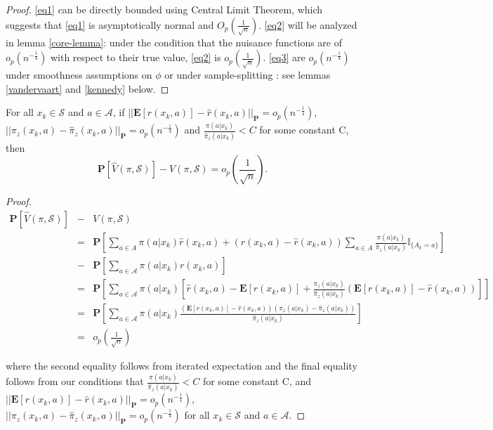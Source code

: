 \begin{proof}
\eqref{eq1} can be directly bounded using Central Limit Theorem, which suggests that \eqref{eq1} is asymptotically normal and  $O_p(\frac{1}{\sqrt{n}})$. \eqref{eq2} will be analyzed in lemma \ref{core-lemma}: under the condition that the nuisance functions are of $o_p(n^{-\frac{1}{4}})$ with respect to their true value, \eqref{eq2} is $o_p(\frac{1}{\sqrt{n}})$. \eqref{eq3} are $o_p(n^{-\frac{1}{4}})$ under smoothness assumptions on $\phi$ \cite{van2000asymptotic} or under sample-splitting \cite{kennedy2018sharp}: see lemmas \ref{vandervaart} and \ref{kennedy} below. 
\end{proof}



\begin{lemma} \label{core-lemma}
For all $x_k \in \mathcal{S}$ and $a \in \mathcal{A}$, if $||\mathbf{E}[r(x_k, a)] - \hat{r}(x_k, a)||_{\mathbf{P}} = o_p(n^{-\frac{1}{4}})$,
\\ $||\pi_z(x_k, a) - \hat{\pi}_z(x_k, a)||_{\mathbf{P}} = o_p(n^{-\frac{1}{4}})$ and $\frac{\pi(a|x_k)}{\hat{\pi}_z(a|x_k)} <  C$ for some constant C, then
$$\mathbf{P}[\widehat{V}(\pi, \mathcal{S})] - V(\pi, \mathcal{S}) = o_p(\frac{1}{\sqrt{n}}).$$
\end{lemma}

\begin{proof}
\begin{eqnarray*}
\mathbf{P}[\widehat{V}(\pi, \mathcal{S})]  &-& V(\pi, \mathcal{S})\\ 
 &=& \mathbf{P}\left[\sum_{a \in A} \pi(a|x_k) \hat{r}(x_k, a) +   (r(x_k, a) - \hat{r}(x_k, a))   \sum_{a \in A} \frac{\pi(a|x_k)}{\hat{\pi}_{z}(a|x_k)}  \mathbb{I}_{\{A_k =a\}} \right] \\
 &-& \mathbf{P} \left[ \sum_{a \in \mathcal{A}} \pi(a|x_k) r(x_k, a)  \right] \\
 &=& \mathbf{P} \left[  \sum_{a \in \mathcal{A}} \pi(a|x_k) \left[ \hat{r}(x_k, a) - \mathbf{E}[r(x_k,a)] +    \frac{\pi_z(a|x_k)}{\hat{\pi}_{z}(a|x_k)} (\mathbf{E}[r(x_k, a)] - \hat{r}(x_k, a))  \right] \right]\\
 &=& \mathbf{P} \left[  \sum_{a \in \mathcal{A}} \pi(a|x_k)    \frac{(\mathbf{E}[r(x_k, a)] - \hat{r}(x_k, a)) (\pi_z(a| x_k) - \hat{\pi}_z(a| x_k))}{\hat{\pi}_z(a| x_k)}
 \right]\\
 &=& o_p(\frac{1}{\sqrt{n}})
\end{eqnarray*}


where the second equality follows from iterated expectation and the final equality follows from our conditions that $\frac{\pi(a|x_k)}{\hat{\pi}_z(a|x_k)} <  C$ for some constant C, and
$||\mathbf{E}[r(x_k, a)] - \hat{r}(x_k, a)||_{\mathbf{P}} = o_p(n^{-\frac{1}{4}})$,
\\ $||\pi_z(x_k, a) - \hat{\pi}_z(x_k, a)||_{\mathbf{P}}= o_p(n^{-\frac{1}{4}})$ for all $x_k \in \mathcal{S}$ and $a \in \mathcal{A}$.

\end{proof}

